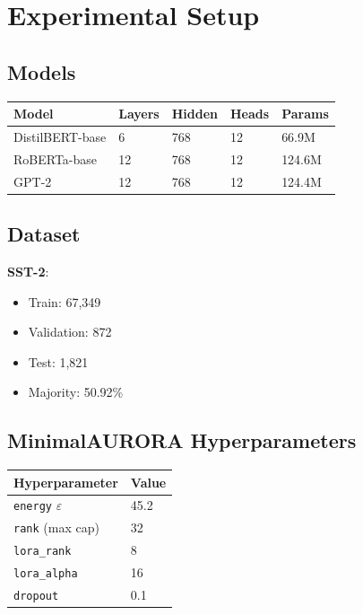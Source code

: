 \section{Experimental Setup}

\subsection{Models}

\begin{table}[H]
\centering
\small
\begin{tabular}{lllll}
\toprule
\textbf{Model} & \textbf{Layers} & \textbf{Hidden} & \textbf{Heads} & \textbf{Params} \\
\midrule
DistilBERT-base & 6 & 768 & 12 & 66.9M \\
RoBERTa-base & 12 & 768 & 12 & 124.6M \\
GPT-2 & 12 & 768 & 12 & 124.4M \\
\bottomrule
\end{tabular}
\end{table}

\subsection{Dataset}

\textbf{SST-2}:
\begin{itemize}
\item Train: 67,349
\item Validation: 872
\item Test: 1,821
\item Majority: 50.92\%

\end{itemize}
\subsection{MinimalAURORA Hyperparameters}

\begin{table}[H]
\centering
\small
\begin{tabular}{ll}
\toprule
\textbf{Hyperparameter} & \textbf{Value} \\
\midrule
\texttt{energy} $\varepsilon$ & 45.2 \\
\texttt{rank} (max cap) & 32 \\
\texttt{lora\_rank} & 8 \\
\texttt{lora\_alpha} & 16 \\
\texttt{dropout} & 0.1 \\
\bottomrule
\end{tabular}
\end{table}

